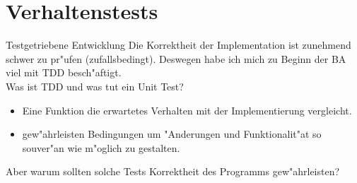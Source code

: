 \documentclass{beamer}
\begin{document}

\section{Verhaltenstests}
\begin{frame}{Testgetriebene Entwicklung}
Die Korrektheit der Implementation ist zunehmend schwer zu pr"ufen (zufallsbedingt). Deswegen habe ich mich zu Beginn der BA viel mit TDD besch"aftigt.\\\pause
Was ist TDD und was tut ein Unit Test?
\begin{itemize}
	\item Eine Funktion die erwartetes Verhalten mit der Implementierung vergleicht.
	\item gew"ahrleisten Bedingungen um "Anderungen und Funktionalit"at so souver"an wie m"oglich zu gestalten.
\end{itemize}\pause
Aber warum sollten solche Tests Korrektheit des Programms gew"ahrleisten?
\end{frame}
\end{document}

